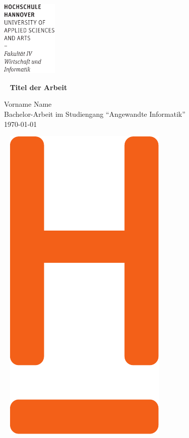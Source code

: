 \documentclass[12pt,DIV14,BCOR10mm,a4paper,twoside,parskip=half-,headsepline,headinclude]{scrreprt}
\begin{document}
  \thispagestyle{empty} %
\includegraphics[width=0.2\textwidth]{Wortmarke_WI_schwarz}

   {  ~ \sffamily
  \vfill
  {\Huge\bfseries Titel der Arbeit}
  \bigskip

  {\Large
  Vorname Name \\[2ex]
 Bachelor-Arbeit im Studiengang "`Angewandte Informatik"'
 \\[5ex]
   \today }
}
 \vfill

  ~ \hfill
  \includegraphics[height=0.3\paperheight]{H_WI_Pantone1665}

\vspace*{-3cm}
\end{document}
